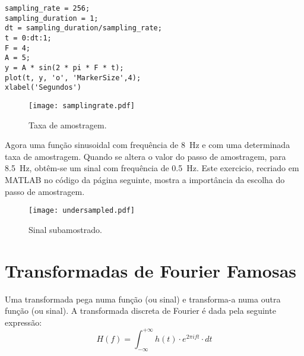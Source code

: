 \newpara

\begin{lstlisting}[style=Matlab-editor, basicstyle=\small, label={lst: sampling rate}]
sampling_rate = 256;
sampling_duration = 1; 
dt = sampling_duration/sampling_rate;
t = 0:dt:1;
F = 4;
A = 5;
y = A * sin(2 * pi * F * t);
plot(t, y, 'o', 'MarkerSize',4);
xlabel('Segundos')
\end{lstlisting}
    
\begin{figure}[!ht]
\centering
\texttt{[image: samplingrate.pdf]}
\caption{Taxa de amostragem.}
\label{fig:sampling rate}
\end{figure}

Agora uma função sinusoidal com frequência de 8~Hz e com uma determinada taxa de amostragem. Quando se altera o valor do passo de amostragem, para 8.5~Hz, obtêm-se um sinal com frequência de 0.5~Hz. Este exercicio, recriado em MATLAB no código da página seguinte, mostra a importância da escolha do passo de amostragem.


\newpage



\begin{figure}[!ht]
\centering
\texttt{[image: undersampled.pdf]}
\caption{Sinal subamostrado.}
\label{fig:undersampled}
\end{figure}

\newpage

\section{Transformadas de Fourier Famosas}

Uma transformada pega numa função (ou sinal) e transforma-a numa outra função (ou sinal).
A transformada discreta de Fourier é dada pela seguinte expressão:
\begin{equation}
    H(f)=\int_{-\infty}^{+\infty} h(t)\cdot e^{2\pi ift} \cdot dt 
\end{equation}

